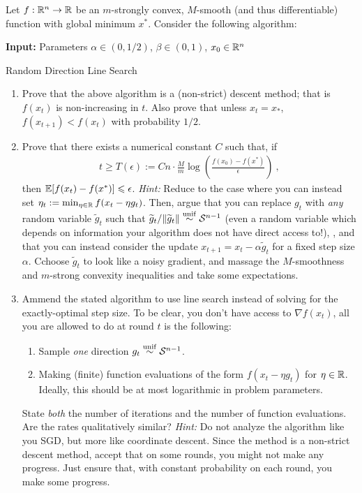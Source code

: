 \documentclass[12pt]{article}
\begin{document}
	Let $f: \mathbb{R}^n \to \mathbb{R}$ be an $m$-strongly convex, $M$-smooth (and thus differentiable) function with global minimum $x^*$. 
%
	Consider the following algorithm:

	\begin{algorithm}[H]
	\SetAlgoLined
	\textbf{Input:} Parameters $\alpha \in (0,1/2)$, $\beta \in (0,1)$, $x_0 \in \mathbb{R}^n$\;
	\caption{Random Direction Line Search}
	\end{algorithm}

\begin{enumerate}
	\item Prove that the above algorithm is a (non-strict) descent method; that is $f(x_t)$ is non-increasing in $t$. Also prove that unless $x_t = x_*$, $f(x_{t+1}) < f(x_t)$ with probability $1/2$. 
	\item Prove that there exists a numerical constant $C$ such that, if 
	\begin{eqnarray}
	t \ge T(\epsilon) := C n \cdot \frac{M}{m} \log (\frac{f(x_0) - f(x^*)}{\epsilon})~,
	\end{eqnarray}
	then $\mathbb{E}[f(x_t) - f(x^*)] \leqslant \epsilon$. \emph{Hint:} Reduce to the case where you can instead set $\eta_t := \min_{\eta  \in \mathbb{R}} f(x_{t}-\eta g_t)$. Then, argue that you can replace $g_t$ with \emph{any} random variable $\widetilde{g}_t$ such that $\widetilde{g}_t/\|\widetilde{g}_t\| \overset{\mathrm{unif}}{\sim} {\cal S}^{n-1}$ (even a random variable which depends on information your algorithm does not have direct access to!), , and that you can instead consider the update $x_{t+1} = x_t - \alpha \widetilde{g}_t$ for a fixed step size $\alpha$. Cchoose $\widetilde{g}_t$ to look like a noisy gradient, and massage the $M$-smoothness and $m$-strong convexity inequalities and take some expectations.
	\item Ammend the stated algorithm to use line search instead of solving for the exactly-optimal step size. To be clear, you don't have access to $\nabla f(x_t)$, all you are allowed to do at round $t$ is the following:
	\begin{enumerate}
		\item Sample \emph{one} direction $g_t \overset{\mathrm{unif}}{\sim} {\cal S}^{n-1}$.
		\item Making (finite) function evaluations of the form $f(x_t - \eta g_t)$ for $\eta \in \mathbb{R}$. Ideally, this should be at most logarithmic in problem parameters.
	\end{enumerate}
	State \emph{both} the number of iterations and the number of function evaluations. Are the rates qualitatively similar? \emph{Hint:} Do not analyze the algorithm like you SGD, but more like coordinate descent. Since the method is a non-strict descent method, accept that on some rounds, you might not make any progress. Just ensure that, with constant probability on each round, you make some progress. 
\end{enumerate}
\end{document}
